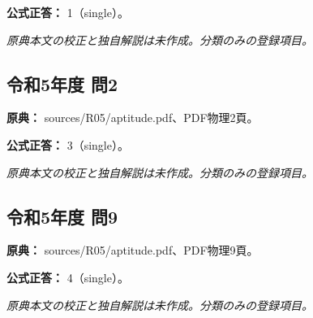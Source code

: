 \textbf{公式正答：} 1（single）。

\par\textit{原典本文の校正と独自解説は未作成。分類のみの登録項目。}

\subsection{令和5年度 問2}
\label{q:r05-reg-apt-02}

\noindent\textbf{原典：} sources/R05/aptitude.pdf、PDF物理2頁。

\textbf{公式正答：} 3（single）。

\par\textit{原典本文の校正と独自解説は未作成。分類のみの登録項目。}

\subsection{令和5年度 問9}
\label{q:r05-reg-apt-09}

\noindent\textbf{原典：} sources/R05/aptitude.pdf、PDF物理9頁。

\textbf{公式正答：} 4（single）。

\par\textit{原典本文の校正と独自解説は未作成。分類のみの登録項目。}
